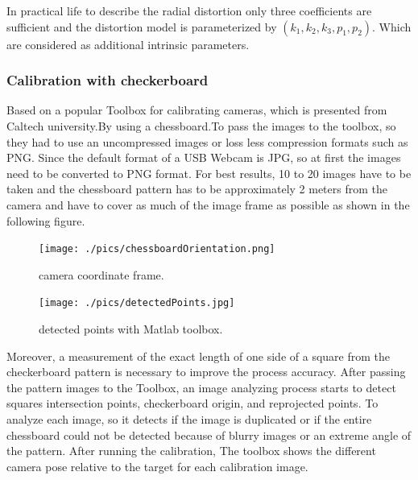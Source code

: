 \documentclass[journal,final,a4paper,twoside]{PS}
\begin{document}
In practical life to describe the radial distortion only three coefficients are sufficient and the distortion model is parameterized by $(k_1,k_2,k_3,p_1,p_2)$. Which are considered as additional intrinsic parameters.

\subsubsection{Calibration with checkerboard}
Based on a popular Toolbox for calibrating cameras, which is presented from Caltech university.By using a chessboard.To pass the images to the toolbox, so they had to use an uncompressed images or loss less compression formats such as PNG. Since the default format of a USB Webcam is JPG, so at first the images need to be converted to PNG format. For best results, 10 to 20 images have to be taken and the chessboard pattern has to be approximately 2 meters from the camera and have to cover as much of the image frame as possible as shown in the following figure.


\begin{figure}[h]
\centering
\parbox{4cm}{
\texttt{[image: ./pics/chessboardOrientation.png]}
\caption{camera coordinate frame\cite{matlab}.}
\label{fig:cameraCoordinateFrame}}
\qquad
\begin{minipage}{4cm}
\texttt{[image: ./pics/detectedPoints.jpg]}
\caption{detected points with Matlab toolbox\cite{matlab}.}
\label{fig:detectedPoints}
\end{minipage}
\end{figure}


Moreover, a measurement of the exact length of one side of a square from the checkerboard pattern is necessary to improve the process accuracy. After passing the pattern images to the Toolbox, an image analyzing process starts to detect squares intersection points, checkerboard origin, and reprojected points.
To analyze each image, so it detects if the image is duplicated or if the entire chessboard could not be detected because of blurry images or an extreme angle of the pattern. After running the calibration,  The toolbox shows the different camera pose relative to the target for each calibration image.
\end{document}
